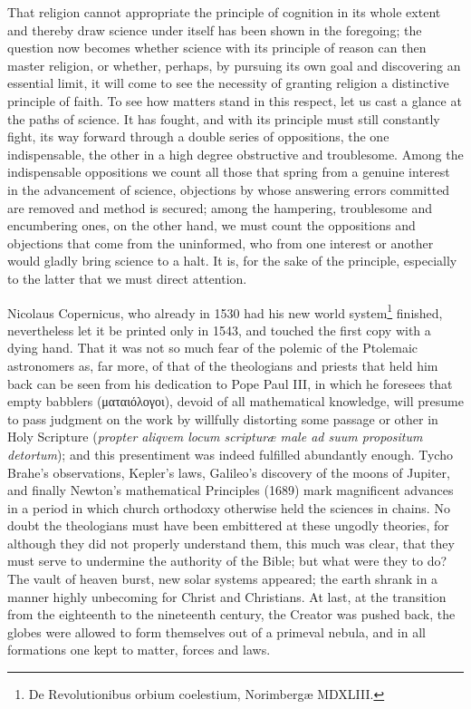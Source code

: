 \documentclass[12pt,a4paper]{article}
\newcommand{\opage}[1]{\marginnote{\footnotesize\textit{[#1]}}}
\begin{document}
That religion cannot appropriate the principle of cognition in its
whole extent and thereby draw science under itself has been
\opage{34}shown in the foregoing; the question now becomes whether
science with its principle of reason can then master religion, or
whether, perhaps, by pursuing its own goal and discovering an
essential limit, it will come to see the necessity of granting
religion a distinctive principle of faith. To see how matters stand
in this respect, let us cast a glance at the paths of science. It has
fought, and with its principle must still constantly fight, its way
forward through a double series of oppositions, the one indispensable,
the other in a high degree obstructive and troublesome. Among the
indispensable oppositions we count all those that spring from a
genuine interest in the advancement of science, objections by whose
answering errors committed are removed and method is secured; among
the hampering, troublesome and encumbering ones, on the other hand, we
must count the oppositions and objections that come from the
uninformed, who from one interest or another would gladly bring science
to a halt. It is, for the sake of the principle, especially to the
latter that we must direct attention.

Nicolaus Copernicus, who already in 1530 had his new world
system\footnote{De Revolutionibus orbium coelestium, Norimbergæ MDXLIII.} %
finished, nevertheless let it be printed only in 1543, and touched the
first copy with a dying hand. That it was not so much fear of the
polemic of the Ptolemaic astronomers as, far more, of that of the
theologians and priests that held him back can be seen from his
dedication to Pope Paul III, in which he foresees that empty babblers
(ματαιόλογοι), devoid of all mathematical knowledge, will presume to
pass judgment on the work by willfully distorting some passage or
other in Holy Scripture (\textit{propter aliqvem locum scripturæ male
ad suum propositum detortum}); and this presentiment was indeed
fulfilled abundantly enough. Tycho Brahe's observations, Kepler's
laws, Galileo's discovery of the moons of Jupiter, and finally
Newton's mathematical Principles (1689) mark magnificent advances in a
period in which church orthodoxy otherwise held the sciences in
chains. No doubt the theologians must have been embittered at these
ungodly theories, for although they
\opage{35}did not properly understand them, this much was clear, that
they must serve to undermine the authority of the Bible; but what were
they to do? The vault of heaven burst, new solar systems appeared; the
earth shrank in a manner highly unbecoming for Christ and Christians.
At last, at the transition from the eighteenth to the nineteenth
century, the Creator was pushed back, the globes were allowed to form
themselves out of a primeval nebula, and in all formations one kept
to matter, forces and laws.
\end{document}

